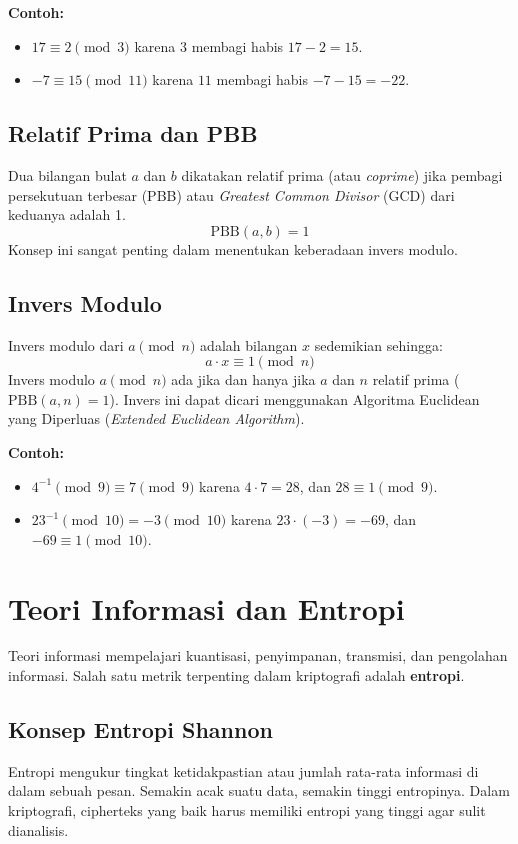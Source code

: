 \documentclass[../main.tex]{subfiles}
\begin{document}
\textbf{Contoh:}
\begin{itemize}
    \item $17 \equiv 2 \pmod{3}$ karena $3$ membagi habis $17 - 2 = 15$.
    \item $-7 \equiv 15 \pmod{11}$ karena $11$ membagi habis $-7 - 15 = -22$.
\end{itemize}

\subsection{Relatif Prima dan PBB}
Dua bilangan bulat $a$ dan $b$ dikatakan relatif prima (atau \textit{coprime}) jika pembagi persekutuan terbesar (PBB) atau \textit{Greatest Common Divisor} (GCD) dari keduanya adalah 1.
\[ \text{PBB}(a, b) = 1 \]
Konsep ini sangat penting dalam menentukan keberadaan invers modulo.

\subsection{Invers Modulo}
Invers modulo dari $a \pmod{n}$ adalah bilangan $x$ sedemikian sehingga:
\[ a \cdot x \equiv 1 \pmod{n} \]
Invers modulo $a \pmod{n}$ ada jika dan hanya jika $a$ dan $n$ relatif prima ($\text{PBB}(a, n) = 1$). Invers ini dapat dicari menggunakan Algoritma Euclidean yang Diperluas (\textit{Extended Euclidean Algorithm}).

\textbf{Contoh:}
\begin{itemize}
    \item $4^{-1} \pmod{9} \equiv 7 \pmod{9}$ karena $4 \cdot 7 = 28$, dan $28 \equiv 1 \pmod{9}$.
    \item $23^{-1} \pmod{10} = -3 \pmod{10}$ karena $23 \cdot (-3) = -69$, dan $-69 \equiv 1 \pmod{10}$.
\end{itemize}

\section{Teori Informasi dan Entropi}
Teori informasi mempelajari kuantisasi, penyimpanan, transmisi, dan pengolahan informasi. Salah satu metrik terpenting dalam kriptografi adalah \textbf{entropi}.

\subsection{Konsep Entropi Shannon}
Entropi mengukur tingkat ketidakpastian atau jumlah rata-rata informasi di dalam sebuah pesan. Semakin acak suatu data, semakin tinggi entropinya. Dalam kriptografi, cipherteks yang baik harus memiliki entropi yang tinggi agar sulit dianalisis.
\end{document}
